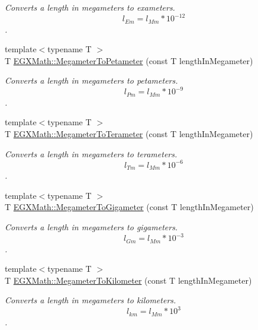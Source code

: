 \begin{DoxyCompactItemize}
\begin{DoxyCompactList}\small\item\em Converts a length in megameters to exameters. \[ l_{Em}=l_{Mm} * 10^{-12} \]. \end{DoxyCompactList}\item 
{\footnotesize template$<$typename T $>$ }\\T \mbox{\hyperlink{group___e_g_x_math-_conversions-_length_conversions-_s_i-_megameter-_s_i_gad40646b8456e092061f26bc6c6c65925}{E\+G\+X\+Math\+::\+Megameter\+To\+Petameter}} (const T length\+In\+Megameter)
\begin{DoxyCompactList}\small\item\em Converts a length in megameters to petameters. \[ l_{Pm}=l_{Mm} * 10^{-9} \]. \end{DoxyCompactList}\item 
{\footnotesize template$<$typename T $>$ }\\T \mbox{\hyperlink{group___e_g_x_math-_conversions-_length_conversions-_s_i-_megameter-_s_i_ga381dd9fb7b3a0867e03bde8de98ee82e}{E\+G\+X\+Math\+::\+Megameter\+To\+Terameter}} (const T length\+In\+Megameter)
\begin{DoxyCompactList}\small\item\em Converts a length in megameters to terameters. \[ l_{Tm}=l_{Mm} * 10^{-6} \]. \end{DoxyCompactList}\item 
{\footnotesize template$<$typename T $>$ }\\T \mbox{\hyperlink{group___e_g_x_math-_conversions-_length_conversions-_s_i-_megameter-_s_i_gaa59e3194a054aeb6623886f72e245103}{E\+G\+X\+Math\+::\+Megameter\+To\+Gigameter}} (const T length\+In\+Megameter)
\begin{DoxyCompactList}\small\item\em Converts a length in megameters to gigameters. \[ l_{Gm}=l_{Mm} * 10^{-3} \]. \end{DoxyCompactList}\item 
{\footnotesize template$<$typename T $>$ }\\T \mbox{\hyperlink{group___e_g_x_math-_conversions-_length_conversions-_s_i-_megameter-_s_i_gac428a2600cebd4a837801bef72380560}{E\+G\+X\+Math\+::\+Megameter\+To\+Kilometer}} (const T length\+In\+Megameter)
\begin{DoxyCompactList}\small\item\em Converts a length in megameters to kilometers. \[ l_{km}=l_{Mm} * 10^{3} \]. \end{DoxyCompactList}\item 

\end{DoxyCompactItemize}
